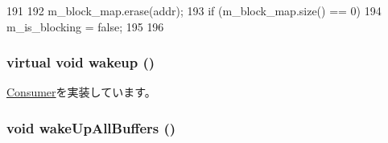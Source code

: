 \begin{DoxyCode}
191 {
192     m_block_map.erase(addr);
193     if (m_block_map.size() == 0) {
194        m_is_blocking = false;
195     }
196 }
\end{DoxyCode}
\hypertarget{classAbstractController_a623e3e7d1b1c725d70009f7b01a421b9}{
\subsubsection[{wakeup}]{\setlength{\rightskip}{0pt plus 5cm}virtual void wakeup ()}}
\label{classAbstractController_a623e3e7d1b1c725d70009f7b01a421b9}


\hyperlink{classConsumer_a623e3e7d1b1c725d70009f7b01a421b9}{Consumer}を実装しています。\hypertarget{classAbstractController_aa595bebc4acf9a8dfec0b5a99f0b86e2}{
\subsubsection[{wakeUpAllBuffers}]{\setlength{\rightskip}{0pt plus 5cm}void wakeUpAllBuffers ()}}
\label{classAbstractController_aa595bebc4acf9a8dfec0b5a99f0b86e2}



